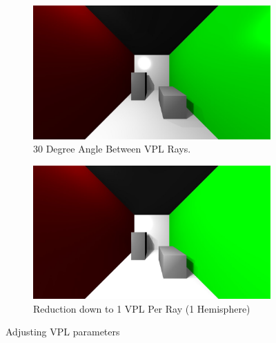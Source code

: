 \begin{figure}
        \centering
        \begin{subfigure}[b]{1.0\textwidth}
                \includegraphics[width=\textwidth]{3.jpg}
                \caption{30 Degree Angle Between VPL Rays.}
                \label{fig:VPLangleIncrease}
        \end{subfigure}
        \begin{subfigure}[b]{1.0\textwidth}
                \includegraphics[width=\textwidth]{7.jpg}
                \caption{Reduction down to 1 VPL Per Ray (1 Hemisphere)}
                \label{fig:hemisphereReduction}
        \end{subfigure}
        \caption{Adjusting VPL parameters}\label{fig:vplparameters}
\end{figure}


